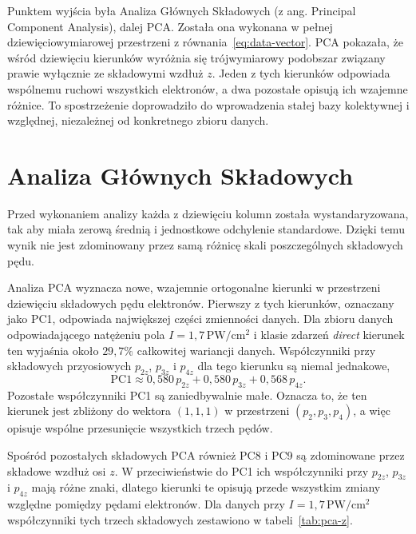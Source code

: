\documentclass[12pt,letterpaper,oneside]{report}
\numberwithin{equation}{chapter}
\numberwithin{figure}{chapter}
\numberwithin{table}{chapter}
\newcommand{\direct}{\textit{direct}}
\begin{document}
Punktem wyjścia była Analiza Głównych Składowych (z ang. Principal Component Analysis), dalej PCA. Została ona wykonana w pełnej dziewięciowymiarowej przestrzeni z równania~\eqref{eq:data-vector}. PCA pokazała, że wśród dziewięciu kierunków wyróżnia się trójwymiarowy podobszar związany prawie wyłącznie ze składowymi wzdłuż $z$. Jeden z tych kierunków odpowiada wspólnemu ruchowi wszystkich elektronów, a dwa pozostałe opisują ich wzajemne różnice. To spostrzeżenie doprowadziło do wprowadzenia stałej bazy kolektywnej i względnej, niezależnej od konkretnego zbioru danych.

\section{Analiza Głównych Składowych}

Przed wykonaniem analizy każda z dziewięciu kolumn została wystandaryzowana, tak aby miała zerową średnią i jednostkowe odchylenie standardowe. Dzięki temu wynik nie jest zdominowany przez samą różnicę skali poszczególnych składowych pędu.

Analiza PCA wyznacza nowe, wzajemnie ortogonalne kierunki w przestrzeni dziewięciu składowych pędu elektronów. Pierwszy z tych kierunków, oznaczany jako PC1, odpowiada największej części zmienności danych. Dla zbioru danych odpowiadającego natężeniu pola
\(I=1{,}7\,\mathrm{PW/cm^2}\) i klasie zdarzeń \direct{}
kierunek ten wyjaśnia około \(29{,}7\%\) całkowitej wariancji danych. Współczynniki przy składowych przyosiowych $p_{2z}$, $p_{3z}$ i $p_{4z}$ dla tego kierunku są niemal jednakowe,
\begin{equation}
\mathrm{PC1}\approx
0{,}580\,p_{2z}+0{,}580\,p_{3z}+0{,}568\,p_{4z}.
\label{eq:pc1}
\end{equation}
Pozostałe współczynniki PC1 są zaniedbywalnie małe. Oznacza to, że ten kierunek jest zbliżony do wektora $(1,1,1)$ w przestrzeni $(p_2,p_3,p_4)$, a więc opisuje wspólne przesunięcie wszystkich trzech pędów.

Spośród pozostałych składowych PCA również PC8 i PC9 są zdominowane przez składowe wzdłuż osi $z$. W przeciwieństwie do PC1 ich współczynniki przy $p_{2z}$, $p_{3z}$ i $p_{4z}$ mają różne znaki, dlatego kierunki te opisują przede wszystkim zmiany względne pomiędzy pędami elektronów. Dla danych przy \(I=1{,}7\,\mathrm{PW/cm^2}\) współczynniki tych trzech składowych zestawiono w tabeli~\ref{tab:pca-z}.
\end{document}
